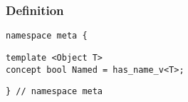 
\subsubsection{Definition}

\begin{verbatim}
namespace meta {
\end{verbatim}
\begin{verbatim}
template <Object T>
concept bool Named = has_name_v<T>;

\end{verbatim}
\begin{verbatim}
} // namespace meta
\end{verbatim}
